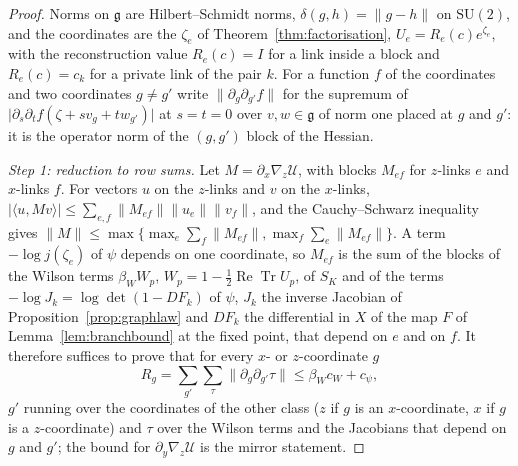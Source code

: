 \documentclass[11pt]{amsart}
\theoremstyle{definition}
\theoremstyle{remark}
\numberwithin{equation}{section}
\newcommand{\SU}{\mathrm{SU}}
\newcommand{\g}{\mathfrak{g}}
\newcommand{\ReTr}{\operatorname{Re}\operatorname{Tr}}
\newcommand{\ip}[2]{\langle #1,#2\rangle}
\begin{document}
\begin{proof}
Norms on $\g$ are Hilbert--Schmidt norms, $\delta(g,h)=\lVert g-h\rVert$
on $\SU(2)$, and the coordinates are the $\zeta_e$ of
Theorem~\ref{thm:factorisation}, $U_e=R_e(c)e^{\zeta_e}$, with the
reconstruction value $R_e(c)=I$ for a link inside a block and
$R_e(c)=c_k$ for a private link of the pair $k$. For a function $f$ of
the coordinates and two coordinates $g\ne g'$ write
$\lVert\partial_g\partial_{g'}f\rVert$ for the supremum of
$\lvert\partial_s\partial_tf(\zeta+sv_g+tw_{g'})\rvert$ at $s=t=0$ over
$v,w\in\g$ of norm one placed at $g$ and $g'$: it is the operator norm of
the $(g,g')$ block of the Hessian.

\emph{Step 1: reduction to row sums.} Let $M=\partial_x\nabla_z\mathcal U$,
with blocks $M_{ef}$ for $z$-links $e$ and $x$-links $f$. For vectors $u$
on the $z$-links and $v$ on the $x$-links,
$\lvert\ip u{Mv}\rvert\le\sum_{e,f}\lVert M_{ef}\rVert\lVert u_e\rVert
\lVert v_f\rVert$, and the Cauchy--Schwarz inequality gives
$\lVert M\rVert\le\max\{\max_e\sum_f\lVert M_{ef}\rVert,\max_f\sum_e
\lVert M_{ef}\rVert\}$. A term $-\log j(\zeta_e)$ of $\psi$ depends on
one coordinate, so $M_{ef}$ is the sum of the blocks of the Wilson terms
$\beta_WW_p$, $W_p=1-\frac12\ReTr U_p$, of $S_K$ and of the terms
$-\log J_k=\log\det(1-DF_k)$ of $\psi$, $J_k$ the inverse Jacobian of
Proposition~\ref{prop:graphlaw} and $DF_k$ the differential in $X$ of the
map $F$ of Lemma~\ref{lem:branchbound} at the fixed point, that depend on
$e$ and on $f$. It therefore suffices to prove that for every $x$- or
$z$-coordinate $g$
\[
R_g=\sum_{g'}\sum_\tau\lVert\partial_g\partial_{g'}\tau\rVert\le
\beta_Wc_W+c_\psi ,
\]
$g'$ running over the coordinates of the other class ($z$ if $g$ is an
$x$-coordinate, $x$ if $g$ is a $z$-coordinate) and $\tau$ over the
Wilson terms and the Jacobians that depend on $g$ and $g'$; the bound for
$\partial_y\nabla_z\mathcal U$ is the mirror statement.


\end{proof}
\end{document}
